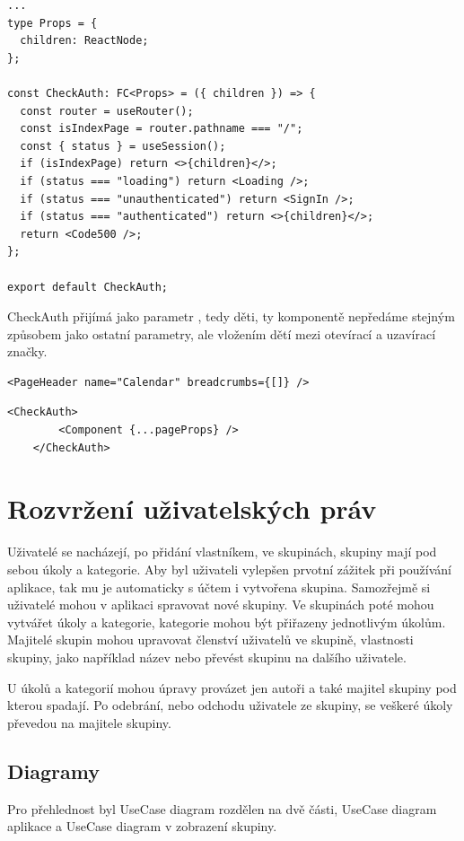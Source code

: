 \begin{lstlisting}[caption=Komponenta CheckAuth]
...
type Props = {
  children: ReactNode;
};

const CheckAuth: FC<Props> = ({ children }) => {
  const router = useRouter();
  const isIndexPage = router.pathname === "/";
  const { status } = useSession();
  if (isIndexPage) return <>{children}</>;
  if (status === "loading") return <Loading />;
  if (status === "unauthenticated") return <SignIn />;
  if (status === "authenticated") return <>{children}</>;
  return <Code500 />;
};

export default CheckAuth;

\end{lstlisting}
CheckAuth přijímá jako parametr , tedy děti, ty komponentě nepředáme stejným způsobem jako ostatní parametry, ale vložením dětí mezi otevírací a uzavírací značky.
\begin{lstlisting}[caption=Standardní předání parametrů komponentě]
    <PageHeader name="Calendar" breadcrumbs={[]} />
\end{lstlisting}
\begin{lstlisting}[caption=Předání dětí komponentě]
    <CheckAuth>
        <Component {...pageProps} />
    </CheckAuth>
\end{lstlisting}
\section{Rozvržení uživatelských práv}
Uživatelé se nacházejí, po přidání vlastníkem, ve skupinách, skupiny mají pod sebou úkoly a kategorie. Aby byl uživateli vylepšen prvotní zážitek při používání aplikace, tak mu je automaticky s účtem i vytvořena skupina. Samozřejmě si uživatelé mohou v aplikaci spravovat nové skupiny. Ve skupinách poté mohou vytvářet úkoly a kategorie, kategorie mohou být přiřazeny jednotlivým úkolům. Majitelé skupin mohou upravovat členství uživatelů ve skupině, vlastnosti skupiny, jako například název nebo převést skupinu na dalšího uživatele. 

U úkolů a kategorií mohou úpravy provázet jen autoři a také majitel skupiny pod kterou spadají. Po odebrání, nebo odchodu uživatele ze skupiny, se veškeré úkoly převedou na majitele skupiny. 
\newpage
\subsection{Diagramy}
Pro přehlednost byl UseCase diagram rozdělen na dvě části, UseCase diagram aplikace a UseCase diagram v zobrazení skupiny.

